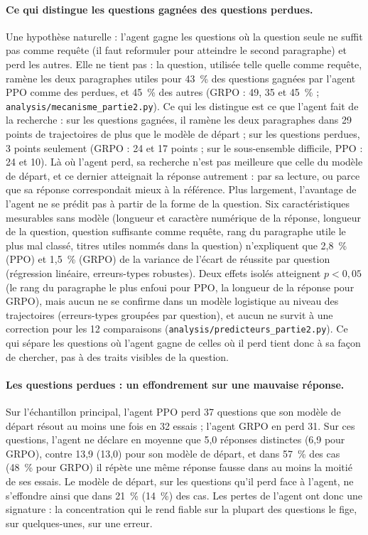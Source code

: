 \documentclass[11pt,a4paper]{article}
\begin{document}
\paragraph{Ce qui distingue les questions gagnées des questions perdues.} Une hypothèse naturelle : l'agent gagne les questions où la question seule ne suffit pas comme requête (il faut reformuler pour atteindre le second paragraphe) et perd les autres. Elle ne tient pas : la question, utilisée telle quelle comme requête, ramène les deux paragraphes utiles pour 43~\% des questions gagnées par l'agent PPO comme des perdues, et 45~\% des autres (GRPO : 49, 35 et 45~\% ; \texttt{analysis/mecanisme\_partie2.py}). Ce qui les distingue est ce que l'agent fait de la recherche : sur les questions gagnées, il ramène les deux paragraphes dans 29 points de trajectoires de plus que le modèle de départ ; sur les questions perdues, 3 points seulement (GRPO : 24 et 17 points ; sur le sous-ensemble difficile, PPO : 24 et 10). Là où l'agent perd, sa recherche n'est pas meilleure que celle du modèle de départ, et ce dernier atteignait la réponse autrement : par sa lecture, ou parce que sa réponse correspondait mieux à la référence. Plus largement, l'avantage de l'agent ne se prédit pas à partir de la forme de la question. Six caractéristiques mesurables sans modèle (longueur et caractère numérique de la réponse, longueur de la question, question suffisante comme requête, rang du paragraphe utile le plus mal classé, titres utiles nommés dans la question) n'expliquent que 2,8~\% (PPO) et 1,5~\% (GRPO) de la variance de l'écart de réussite par question (régression linéaire, erreurs-types robustes). Deux effets isolés atteignent $p < 0{,}05$ (le rang du paragraphe le plus enfoui pour PPO, la longueur de la réponse pour GRPO), mais aucun ne se confirme dans un modèle logistique au niveau des trajectoires (erreurs-types groupées par question), et aucun ne survit à une correction pour les 12 comparaisons (\texttt{analysis/predicteurs\_partie2.py}). Ce qui sépare les questions où l'agent gagne de celles où il perd tient donc à sa façon de chercher, pas à des traits visibles de la question.

\paragraph{Les questions perdues : un effondrement sur une mauvaise réponse.} Sur l'échantillon principal, l'agent PPO perd 37 questions que son modèle de départ résout au moins une fois en 32 essais ; l'agent GRPO en perd 31. Sur ces questions, l'agent ne déclare en moyenne que 5,0 réponses distinctes (6,9 pour GRPO), contre 13,9 (13,0) pour son modèle de départ, et dans 57~\% des cas (48~\% pour GRPO) il répète une même réponse fausse dans au moins la moitié de ses essais. Le modèle de départ, sur les questions qu'il perd face à l'agent, ne s'effondre ainsi que dans 21~\% (14~\%) des cas. Les pertes de l'agent ont donc une signature : la concentration qui le rend fiable sur la plupart des questions le fige, sur quelques-unes, sur une erreur.
\end{document}
